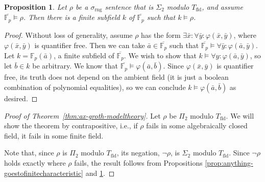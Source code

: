 \documentclass{article}
\theoremstyle{plain}
\newtheorem{prop}[thm]{Proposition}
\theoremstyle{definition}
\newcommand{\ringsig}{\sigma_{\operatorname{rng}}}
\newcommand{\fieldthy}{T_{\operatorname{fld}}}
\newcommand{\tuple}{\bar}
\renewcommand{\phi}{\varphi}
\begin{document}
\begin{prop}\label{prop:sig2-goestofinitefield}
  Let $\rho$ be a $\ringsig$ sentence that is $\Sigma_2$ modulo
  $\fieldthy$, and assume $\overline{\mathbb{F}_p} \models \rho$. Then
  there is a finite subfield $k$ of $\overline{\mathbb{F}_p}$ such
  that $k \models \rho$.
\end{prop}
\begin{proof}
  Without loss of generality, assume $\rho$ has the form $\exists
  \tuple{x} : \forall \tuple{y} : \phi(\tuple{x},\tuple{y})$, where
  $\phi(\tuple{x},\tuple{y})$ is quantifier free. Then we can take
  $\tuple{a} \in \overline{\mathbb{F}_p}$ such that
  $\overline{\mathbb{F}_p} \models \forall \tuple{y}:
  \phi(\tuple{a},\tuple{y})$. Let $k = \mathbb{F}_p(\tuple{a})$, a
  finite subfield of $\overline{\mathbb{F}_p}$. We wish to show that
  $k \models \forall y: \phi(\tuple{a},\tuple{y})$, so let $\tuple{b}
  \in k$ be arbitrary. We know that $\overline{\mathbb{F}_p} \models
  \phi(\tuple{a},\tuple{b})$. Since $\phi(\tuple{x},\tuple{y})$ is
  quantifier free, its truth does not depend on the ambient field (it
  is just a boolean combination of polynomial equalities), so we can
  conclude $k \models \phi(\tuple{a},\tuple{b})$ as desired.
\end{proof}

\begin{proof}[Proof of Theorem~\ref{thm:ax-groth-modeltheory}]
  Let $\rho$ be $\Pi_2$ modulo $\fieldthy$. We will show the theorem
  by contrapositive, i.e., if $\rho$ fails in some algebraically
  closed field, it fails in some finite field.

  Note that, since $\rho$ is $\Pi_2$ modulo $\fieldthy$, its negation,
  $\neg \rho$, is $\Sigma_2$ modulo $\fieldthy$. Since $\neg \rho$
  holds exactly where $\rho$ fails, the result follows from
  Propositions \ref{prop:anything-goestofinitecharacteristic} and
  \ref{prop:sig2-goestofinitefield}.
\end{proof}
\end{document}
